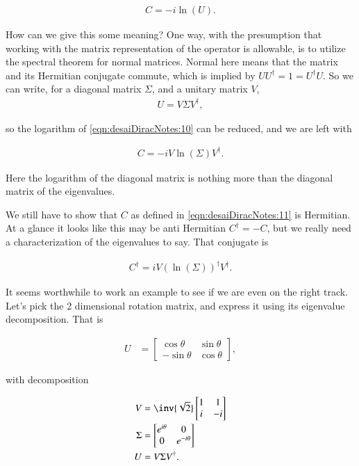 \begin{align}\label{eqn:desaiDiracNotes:10}
C = -i \ln ( U ).
\end{align}

How can we give this some meaning?  One way, with the presumption that working with the matrix representation of the operator is allowable, is to utilize the spectral theorem for normal matrices.  Normal here means that the matrix and its Hermitian conjugate commute, which is implied by $U U^\dagger = 1 = U^\dagger U$.  So we can write, for a diagonal matrix $\Sigma$, and a unitary matrix $V$, 
\begin{align*}
U = V \Sigma V^\dagger,
\end{align*}

so the logarithm of \ref{eqn:desaiDiracNotes:10} can be reduced, and we are left with

\begin{align}\label{eqn:desaiDiracNotes:11}
C = -i V \ln ( \Sigma ) V^\dagger.
\end{align}

Here the logarithm of the diagonal matrix is nothing more than the diagonal matrix of the eigenvalues.

We still have to show that $C$ as defined in \ref{eqn:desaiDiracNotes:11} is Hermitian.  At a glance it looks like this may be anti Hermitian $C^\dagger = -C$, but we really need a characterization of the eigenvalues to say.  That conjugate is

\begin{align}\label{eqn:desaiDiracNotes:11b}
C^\dagger = i V (\ln ( \Sigma ))^\dagger V^\dagger.
\end{align}

It seems worthwhile to work an example to see if we are even on the right track.  Let's pick the 2 dimensional rotation matrix, and express it using its eigenvalue decomposition.  That is

\begin{align}\label{eqn:desaiDiracNotes:12}
U &= 
\begin{bmatrix}
\cos\theta & \sin\theta \\
-\sin\theta & \cos\theta
\end{bmatrix},
\end{align}

with decomposition

\begin{align}\label{eqn:desaiDiracNotes:12b}
V &= \inv{\sqrt{2}} 
\begin{bmatrix}
1 & 1 \\
i & -i \\
\end{bmatrix} \\
\Sigma &= 
\begin{bmatrix}
e^{i\theta} & 0 \\
0 & e^{-i\theta} 
\end{bmatrix} \\
U &= V \Sigma V^\dagger.
\end{align}

